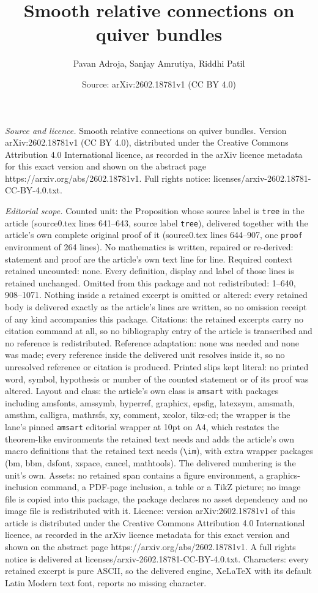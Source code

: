 \documentclass[10pt,a4paper]{amsart}
\title[Smooth relative connections on quiver bundles]{Smooth relative connections on quiver bundles}
\author{Pavan Adroja, Sanjay Amrutiya, Riddhi Patil}
\date{Source: arXiv:2602.18781v1 (CC BY 4.0)}
\begin{document}
\maketitle

\noindent\emph{Source and licence.} Smooth relative connections on quiver bundles. Version arXiv:2602.18781v1 (CC BY 4.0), distributed under the Creative Commons Attribution 4.0 International licence, as recorded in the arXiv licence metadata for this exact version and shown on the abstract page https://arxiv.org/abs/2602.18781v1. Full rights notice: licenses/arxiv-2602.18781-CC-BY-4.0.txt.\par\smallskip

\noindent\textit{Editorial scope.} Counted unit: the Proposition whose source label is \texttt{tree} in the article (source0.tex lines 641--643, source label \texttt{tree}), delivered together with the article's own complete original proof of it (source0.tex lines 644--907, one \texttt{proof} environment of 264 lines). No mathematics is written, repaired or re-derived: statement and proof are the article's own text line for line. Required context retained uncounted: none. Every definition, display and label of those lines is retained unchanged. Omitted from this package and not redistributed: 1--640, 908--1071. Nothing inside a retained excerpt is omitted or altered: every retained body is delivered exactly as the article's lines are written, so no omission receipt of any kind accompanies this package. Citations: the retained excerpts carry no citation command at all, so no bibliography entry of the article is transcribed and no reference is redistributed. Reference adaptation: none was needed and none was made; every reference inside the delivered unit resolves inside it, so no unresolved reference or citation is produced. Printed slips kept literal: no printed word, symbol, hypothesis or number of the counted statement or of its proof was altered. Layout and class: the article's own class is \texttt{amsart} with packages including amsfonts, amssymb, hyperref, graphicx, epsfig, latexsym, amsmath, amsthm, calligra, mathrsfs, xy, comment, xcolor, tikz-cd; the wrapper is the lane's pinned \texttt{amsart} editorial wrapper at 10pt on A4, which restates the theorem-like environments the retained text needs and adds the article's own macro definitions that the retained text needs (\texttt{\textbackslash im}), with extra wrapper packages (bm, bbm, dsfont, xspace, cancel, mathtools). The delivered numbering is the unit's own. Assets: no retained span contains a figure environment, a graphics-inclusion command, a PDF-page inclusion, a table or a TikZ picture; no image file is copied into this package, the package declares no asset dependency and no image file is redistributed with it. Licence: version arXiv:2602.18781v1 of this article is distributed under the Creative Commons Attribution 4.0 International licence, as recorded in the arXiv licence metadata for this exact version and shown on the abstract page https://arxiv.org/abs/2602.18781v1. A full rights notice is delivered at licenses/arxiv-2602.18781-CC-BY-4.0.txt. Characters: every retained excerpt is pure ASCII, so the delivered engine, XeLaTeX with its default Latin Modern text font, reports no missing character.
\end{document}
